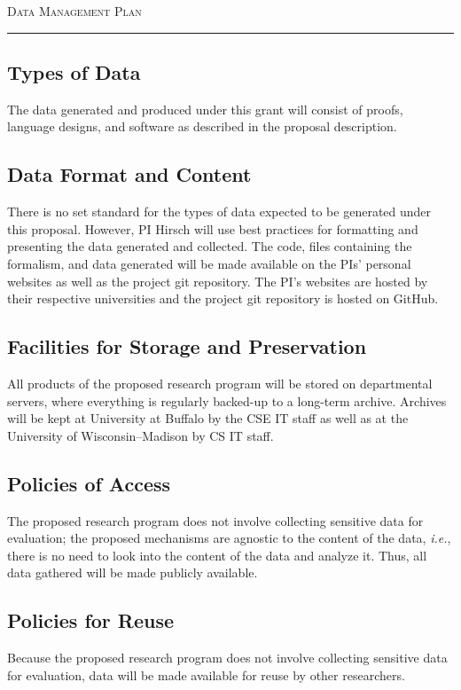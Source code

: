 




\begin{center}
{\LARGE \textsc{Data Management Plan}}
\end{center}
\hrule

\vspace{3mm}

\subsection*{Types of Data}  
The data generated and produced under this grant will consist of proofs, language designs, and software as described in the proposal description.

\subsection*{Data Format and Content}
There is no set standard for the types of data expected to be generated under this proposal. However, PI Hirsch will use best practices for formatting and presenting the data generated and collected.
The code, files containing the formalism, and data generated will be made available on the PIs' personal websites as well as the project git repository.
The PI's websites are hosted by their respective universities and the project git repository is hosted on GitHub.

\subsection*{Facilities for Storage and Preservation}
All products of the proposed research program will be stored on departmental servers, where everything is regularly backed-up to a long-term archive.
Archives will be kept at University at Buffalo by the CSE IT staff as well as at the University of Wisconsin--Madison by CS IT staff.

\subsection*{Policies of Access} 
The proposed research program does not involve collecting sensitive data for evaluation; the proposed mechanisms are agnostic to the content of the data, {\em i.e.}, there is no need to look into the content of the data and analyze it.
Thus, all data gathered will be made publicly available.  

\subsection*{Policies for Reuse}  
Because the proposed research program does not involve collecting sensitive data for evaluation, data will be made available for reuse by other researchers.

